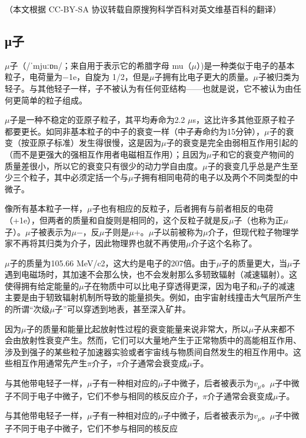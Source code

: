 

（本文根据 CC-BY-SA 协议转载自原搜狗科学百科对英文维基百科的翻译）
\subsection{μ子}

$\mu$子（/ˈmjuːɒn/；来自用于表示它的希腊字母 mu（$\mu$）)是一种类似于电子的基本粒子，电荷量为−1e，自旋为 1/2，但是$\mu$子拥有比电子更大的质量。$\mu$子被归类为轻子。与其他轻子一样，子不被认为有任何亚结构——也就是说，它不被认为由任何更简单的粒子组成。

$\mu$子是一种不稳定的亚原子粒子，其平均寿命为2.2 $\mu$s，这比许多其他亚原子粒子都要更长。如同非基本粒子的中子的衰变一样（中子寿命约为15分钟），$\mu$子的衰变（按亚原子标准）发生得很慢，这是因为$\mu$子的衰变是完全由弱相互作用引起的（而不是更强大的强相互作用者电磁相互作用）；且因为$\mu$子和它的衰变产物间的质量差很小，所以它的衰变只有很少的动力学自由度。$\mu$子的衰变几乎总是产生至少三个粒子，其中必须定括一个与$\mu$子拥有相同电荷的电子以及两个不同类型的中微子。

像所有基本粒子一样，$\mu$子也有相应的反粒子，后者拥有与前者相反的电荷（+1e），但两者的质量和自旋则是相同的，这个反粒子就是反$\mu$子（也称为正$\mu$子）。$\mu$子被表示为$\mu$−，反$\mu$子则是$\mu$+。$\mu$子以前被称为$\mu$介子，但现代粒子物理学家不再将其归类为介子，因此物理界也就不再使用$\mu$介子这个名称了。

$\mu$子的质量为105.66 MeV/c2，这大约是电子的207倍。由于$\mu$子的质量更大，当$\mu$子遇到电磁场时，其加速不会那么快，也不会发射那么多轫致辐射（减速辐射）。这使得拥有给定能量的$\mu$子在物质中可以比电子穿透得更深，因为电子和$\mu$子的减速主要是由于轫致辐射机制所导致的能量损失。例如，由宇宙射线撞击大气层所产生的所谓“次级$\mu$子”可以穿透到地表，甚至深入矿井。

因为$\mu$子的质量和能量比起放射性过程的衰变能量来说非常大，所以$\mu$子从来都不会由放射性衰变产生。然而，它们可以大量地产生于正常物质中的高能相互作用、涉及到强子的某些粒子加速器实验或者宇宙线与物质间自然发生的相互作用中。这些相互作用通常先产生$\pi$介子，$\pi$介子通常会衰变成$\mu$子。

与其他带电轻子一样，$\mu$子有一种相对应的$\mu$子中微子，后者被表示为$v_\mu$。$\mu$子中微子不同于电子中微子，它们不参与相同的核反应介子，$\pi$介子通常会衰变成$\mu$子。

与其他带电轻子一样，$\mu$子有一种相对应的$\mu$子中微子，后者被表示为$v_\mu$。$\mu$子中微子不同于电子中微子，它们不参与相同的核反应
